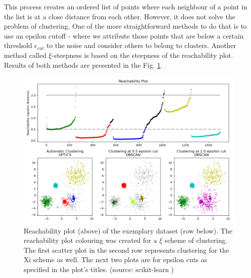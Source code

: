 This process creates an ordered list of points where each neighbour of a point in the list is at a close distance from each other.
However, it does not solve the problem of clustering.
One of the more straightforward methods to do that is to use an epsilon cutoff - where we attribute those points that are below a certain threshold $\epsilon_{cut}$ to the noise and consider others to belong to clusters.
Another method called $\xi$-steepness is based on the steepness of the reachability plot.
Results of both methods are presented in the Fig. \ref{fig:optics}.



\begin{figure}
  \centering
  \includegraphics[width=0.9\linewidth]{figures/chapter3/sphx_glr_plot_optics_001.png}
  \caption{Reachability plot (above) of the exemplary dataset (row below). The reachability plot colouring was created for a $\xi$ \cite{10.1145/304182.304187} scheme of clustering. The first scatter plot in the second  row represents clustering for the Xi scheme as well. The next two plots are for epsilon cuts as specified in the plot's titles. (source: scikit-learn \cite{scikit-learn})}
  \label{fig:optics}
\end{figure}


